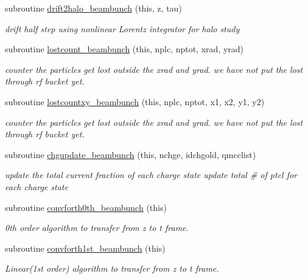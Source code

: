 \begin{DoxyCompactItemize}
subroutine \mbox{\hyperlink{namespacebeambunchclass_a3f5a86fb4b3ff5b33efdfa76b1c52ce4}{drift2halo\+\_\+beambunch}} (this, z, tau)
\begin{DoxyCompactList}\small\item\em drift half step using nonlinear Lorentz integrator for halo study \end{DoxyCompactList}\item 
subroutine \mbox{\hyperlink{namespacebeambunchclass_a618f97b46c83d8ca29a7cb05345d655e}{lostcount\+\_\+beambunch}} (this, nplc, nptot, xrad, yrad)
\begin{DoxyCompactList}\small\item\em counter the particles get lost outside the xrad and yrad. we have not put the lost through rf bucket yet. \end{DoxyCompactList}\item 
subroutine \mbox{\hyperlink{namespacebeambunchclass_a54a4d80405bb8fbde341ea9e46a224e4}{lostcountxy\+\_\+beambunch}} (this, nplc, nptot, x1, x2, y1, y2)
\begin{DoxyCompactList}\small\item\em counter the particles get lost outside the xrad and yrad. we have not put the lost through rf bucket yet. \end{DoxyCompactList}\item 
subroutine \mbox{\hyperlink{namespacebeambunchclass_ac5b1c15c02703f7339b67283bc9816bd}{chgupdate\+\_\+beambunch}} (this, nchge, idchgold, qmcclist)
\begin{DoxyCompactList}\small\item\em update the total current fraction of each charge state update total \# of ptcl for each charge state \end{DoxyCompactList}\item 
subroutine \mbox{\hyperlink{namespacebeambunchclass_a030c80c97cd3523478e56fdaff0e7560}{convforth0th\+\_\+beambunch}} (this)
\begin{DoxyCompactList}\small\item\em 0th order algorithm to transfer from z to t frame. \end{DoxyCompactList}\item 
subroutine \mbox{\hyperlink{namespacebeambunchclass_a35f6511340579ba6bb5f07bebf6d09d5}{convforth1st\+\_\+beambunch}} (this)
\begin{DoxyCompactList}\small\item\em Linear(1st order) algorithm to transfer from z to t frame. \end{DoxyCompactList}\item 

\end{DoxyCompactItemize}
